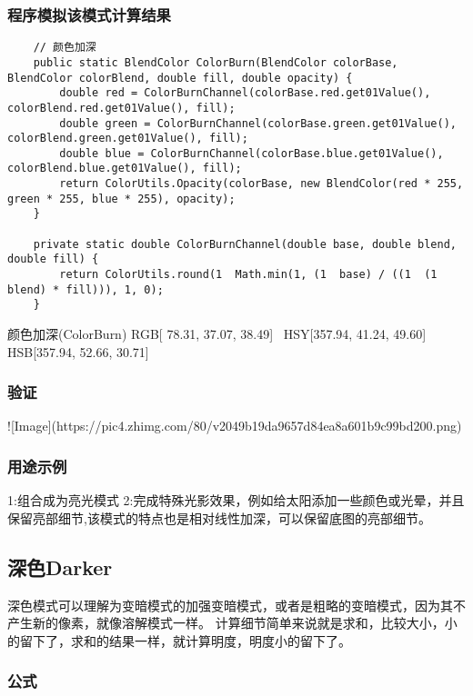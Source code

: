 \subsubsection{ 程序模拟该模式计算结果}
\begin{lstlisting}
	// 颜色加深
	public static BlendColor ColorBurn(BlendColor colorBase, BlendColor colorBlend, double fill, double opacity) {
		double red = ColorBurnChannel(colorBase.red.get01Value(), colorBlend.red.get01Value(), fill);
		double green = ColorBurnChannel(colorBase.green.get01Value(), colorBlend.green.get01Value(), fill);
		double blue = ColorBurnChannel(colorBase.blue.get01Value(), colorBlend.blue.get01Value(), fill);
		return ColorUtils.Opacity(colorBase, new BlendColor(red * 255, green * 255, blue * 255), opacity);
	}
	
	private static double ColorBurnChannel(double base, double blend, double fill) {
		return ColorUtils.round(1  Math.min(1, (1  base) / ((1  (1  blend) * fill))), 1, 0);
	}
\end{lstlisting}


颜色加深(ColorBurn)     RGB[ 78.31,  37.07,  38.49]~ HSY[357.94,  41.24,  49.60]~ HSB[357.94,  52.66,  30.71]


\subsubsection{ 验证}

![Image](https://pic4.zhimg.com/80/v2049b19da9657d84ea8a601b9c99bd200.png)

\subsubsection{ 用途示例}

1:组合成为亮光模式
2:完成特殊光影效果，例如给太阳添加一些颜色或光晕，并且保留亮部细节,该模式的特点也是相对线性加深，可以保留底图的亮部细节。

\subsection{ 深色Darker}

深色模式可以理解为变暗模式的加强变暗模式，或者是粗略的变暗模式，因为其不产生新的像素，就像溶解模式一样。
计算细节简单来说就是求和，比较大小，小的留下了，求和的结果一样，就计算明度，明度小的留下了。

\subsubsection{ 公式}

